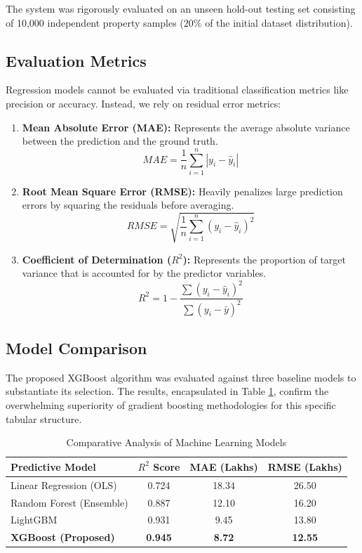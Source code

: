 \documentclass[conference]{IEEEtran}
\begin{document}
The system was rigorously evaluated on an unseen hold-out testing set consisting of 10,000 independent property samples ($20\%$ of the initial dataset distribution). 

\subsection{Evaluation Metrics}
Regression models cannot be evaluated via traditional classification metrics like precision or accuracy. Instead, we rely on residual error metrics:
\begin{enumerate}
    \item \textbf{Mean Absolute Error (MAE):} Represents the average absolute variance between the prediction and the ground truth.
    \begin{equation}
    MAE = \frac{1}{n} \sum_{i=1}^{n} |y_i - \hat{y}_i|
    \end{equation}
    
    \item \textbf{Root Mean Square Error (RMSE):} Heavily penalizes large prediction errors by squaring the residuals before averaging.
    \begin{equation}
    RMSE = \sqrt{\frac{1}{n} \sum_{i=1}^{n} (y_i - \hat{y}_i)^2}
    \end{equation}
    
    \item \textbf{Coefficient of Determination ($R^2$):} Represents the proportion of target variance that is accounted for by the predictor variables.
    \begin{equation}
    R^2 = 1 - \frac{\sum (y_i - \hat{y}_i)^2}{\sum (y_i - \bar{y})^2}
    \end{equation}
\end{enumerate}

\subsection{Model Comparison}
The proposed XGBoost algorithm was evaluated against three baseline models to substantiate its selection. The results, encapsulated in Table \ref{tab:comparison}, confirm the overwhelming superiority of gradient boosting methodologies for this specific tabular structure.

\begin{table}[htbp]
\centering
\caption{Comparative Analysis of Machine Learning Models}
\begin{tabular}{@{}lccc@{}}
\toprule
\textbf{Predictive Model} & \textbf{$R^2$ Score} & \textbf{MAE (Lakhs)} & \textbf{RMSE (Lakhs)} \\ \midrule
Linear Regression (OLS) & 0.724 & 18.34 & 26.50 \\
Random Forest (Ensemble) & 0.887 & 12.10 & 16.20 \\
LightGBM & 0.931 & 9.45 & 13.80 \\
\textbf{XGBoost (Proposed)} & \textbf{0.945} & \textbf{8.72} & \textbf{12.55} \\ \bottomrule
\end{tabular}
\label{tab:comparison}
\end{table}
\end{document}

